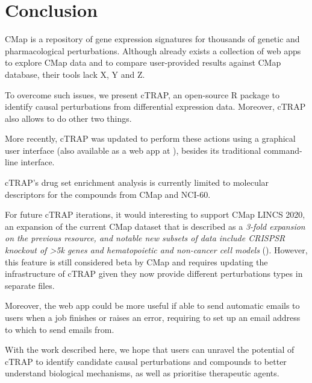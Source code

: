 \section{Conclusion}


CMap is a repository of gene expression signatures for thousands of genetic and pharmacological perturbations. Although  already exists a collection of web apps to explore CMap data and to compare user-provided results against CMap database, their tools lack X, Y and Z.

To overcome such issues, we present cTRAP, an open-source R package to identify causal perturbations from differential expression data. Moreover, cTRAP also allows to do other two things.

More recently, cTRAP was updated to perform these actions using a graphical user interface (also available as a web app at ), besides its traditional command-line interface.

cTRAP's drug set enrichment analysis is currently limited to molecular descriptors for the compounds from CMap and NCI-60.

For future cTRAP iterations, it would interesting to support CMap LINCS 2020, an expansion of the current CMap dataset that is described as a \emph{3-fold expansion on the previous resource, and notable new subsets of data include CRISPSR knockout of \textgreater 5k genes and hematopoietic and non-cancer cell models} (). However, this feature is still considered beta by CMap and requires updating the infrastructure of cTRAP given they now provide different perturbations types in separate files.

Moreover, the web app could be more useful if able to send automatic emails to users when a job finishes or raises an error, requiring to set up an email address to which to send emails from.

With the work described here, we hope that users can unravel the potential of cTRAP to identify candidate causal perturbations and compounds to better understand biological mechanisms, as well as prioritise therapeutic agents.
